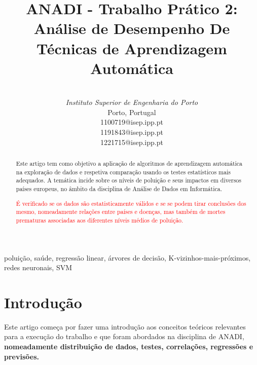 \documentclass[conference]{IEEEtran}
\begin{document}
\title{ANADI - Trabalho Prático 2:\\
Análise de Desempenho De Técnicas de Aprendizagem Automática}

\author{
 \\
\textit{Instituto Superior de Engenharia do Porto}\\
Porto, Portugal \\
 1100719@isep.ipp.pt\\
 1191843@isep.ipp.pt\\
 1221715@isep.ipp.pt\\
}


\maketitle

\begin{abstract}
Este artigo tem como objetivo a aplicação de algoritmos de aprendizagem automática na exploração de dados e respetiva comparação usando os testes estatísticos mais adequados. A temática incide sobre os níveis de poluição e seus impactos em diversos países europeus, no âmbito da disciplina de Análise de Dados em Informática. 

\textcolor{red}{É verificado se os dados são estatisticamente válidos e se se podem tirar conclusões dos mesmo, nomeadamente relações entre países e doenças, mas também de mortes prematuras associadas aos diferentes níveis médios de poluição.  }
\end{abstract}

\begin{IEEEkeywords}
poluição, saúde, regressão linear, árvores de decisão, K-vizinhos-mais-próximos, redes neuronais, SVM
\end{IEEEkeywords}

\section{Introdução}

Este artigo começa por fazer uma introdução aos conceitos teóricos relevantes para a execução do trabalho e que foram abordados na disciplina de ANADI, \textbf{nomeadamente distribuição de dados, testes, correlações, regressões e previsões. }
\end{document}
